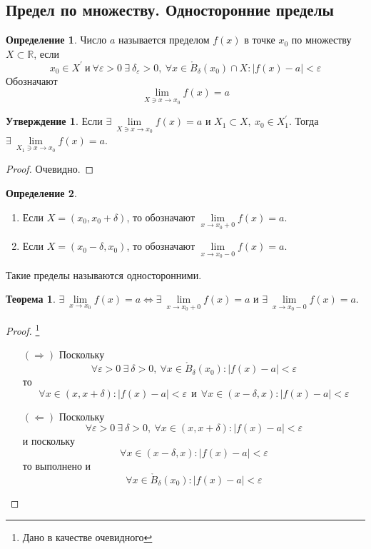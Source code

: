 \documentclass[a4paper, 12pt]{article}
\newcommand{\R}{\mathbb{R}}
\newcommand{\Bo}{\mathring{B}}
\renewcommand{\epsilon}{\varepsilon}
\newcommand\tab[1][.5cm]{\hspace*{#1}}
\theoremstyle{definition}
\newtheorem*{definition}{Определение}
\newtheorem*{theorem}{Теорема}
\newtheorem*{statement}{Утверждение}
\begin{document}
    \subsection{Предел по множеству. Односторонние пределы}
        \begin{definition}
            Число $a$ называется пределом $f(x)$ в точке $x_0$ по множеству $X\subset \R$, если 
            \[x_0\in X^{\prime}\ \text{и}\ \forall\epsilon>0\ \exists\ \delta_{\epsilon}>0,\ \forall x\in \Bo_{\delta}(x_0)\cap X: |f(x)-a|<\epsilon\]
            Обозначают \[\lim\limits_{X\ni x\to x_0}f(x)=a\]
        \end{definition} 
        \begin{statement}
            Если $\exists\ \lim\limits_{X\ni x\to x_0}f(x)=a$ и $X_1\subset X,\ x_0\in X_1^{\prime}$. Тогда\\
            $\exists\ \lim\limits_{X_1\ni x\to x_0}f(x)=a$.
        \end{statement} 
        \begin{proof}
            Очевидно.
        \end{proof}
        \begin{definition}\tab\
            \begin{enumerate}
                \item Если $X=(x_0,x_0+\delta)$, то обозначают $\lim\limits_{x\to x_0+0}f(x)=a$.
                \item Если $X=(x_0-\delta, x_0)$, то обозначают $\lim\limits_{x\to x_0-0}f(x)=a$.
            \end{enumerate}
            Такие пределы называются односторонними.
        \end{definition} 
        \begin{theorem}
            $\exists\ \lim\limits_{x\to x_0}f(x)=a \Leftrightarrow \exists\ \lim\limits_{x\to x_0+0}f(x)=a$ и $\exists\ \lim\limits_{x\to x_0-0}f(x)=a$.
        \end{theorem} 
        \begin{proof}\footnote{Дано в качестве очевидного}
                \begin{itemize}
                    \item[$(\Rightarrow)$] Поскольку \[\forall \epsilon>0\ \exists\ \delta>0,\ \forall x\in \mathring{B}_{\delta}(x_0): |f(x)-a|<\epsilon\]
                    то 
                    \[\forall x\in (x, x+\delta): |f(x)-a|<\epsilon\ \ \text{и}\ \ \forall x\in (x-\delta, x): |f(x)-a|<\epsilon\]
                    \item[$(\Leftarrow)$] Поскольку 
                    \[\forall \epsilon>0\ \exists\ \delta>0,\ \forall x\in (x, x+\delta): |f(x)-a|<\epsilon\]
                    и поскольку 
                    \[\forall x\in (x-\delta, x): |f(x)-a|<\epsilon\]
                    то выполнено и 
                    \[\forall x\in \mathring{B}_{\delta}(x_0): |f(x)-a|<\epsilon\]
                \end{itemize}
        \end{proof} 
\end{document}
